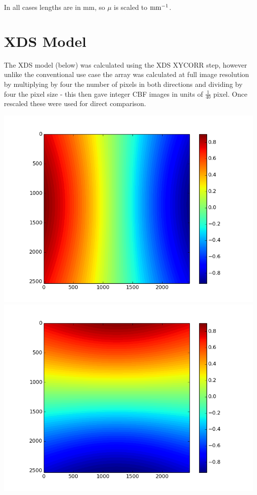 \documentclass{article}
\begin{document}
\noindent
In all cases lengths are in mm, so $\mu$ is scaled to $\rm{mm}^{-1}$.

\section{XDS Model}

The XDS model (below) was calculated using the XDS XYCORR step,
however unlike the conventional use case the array was calculated at
full image resolution by multiplying by four the number of pixels in
both directions and dividing by four the pixel size - this then gave
integer CBF images in units of $\frac{1}{40}$ pixel. Once rescaled these
were used for direct comparison.

{
\centering
\includegraphics[scale=0.3]{xds_parallax_x.png}
\includegraphics[scale=0.3]{xds_parallax_y.png}
}
\end{document}
